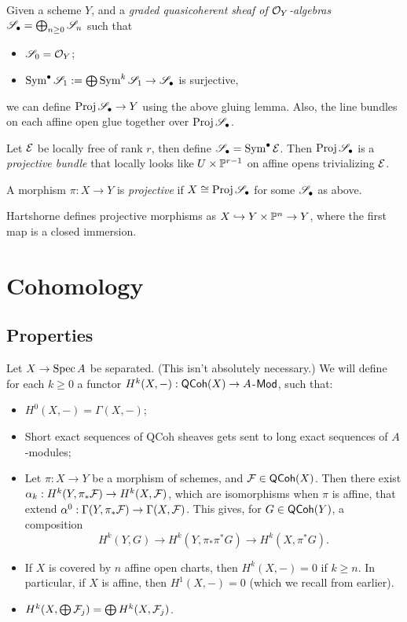 \documentclass[11pt]{amsart}
\begin{document}
Given a scheme $Y$, and a \emph{graded quasicoherent sheaf of $\mathcal{O}_Y$-algebras} $\mathscr{S}_\bullet = \bigoplus_{n\ge 0} \mathscr{S}_n$ such that
\begin{itemize}
    \item $\mathscr{S}_0 = \mathcal{O}_Y$;
    \item $\operatorname{Sym}^{\bullet} \mathscr{S}_1 := \bigoplus \operatorname{Sym}^k \mathscr{S}_1 \to \mathscr{S}_\bullet$ is surjective,
\end{itemize}
we can define $\operatorname{Proj} \mathscr{S}_\bullet\to Y$ using the above gluing lemma. Also, the line bundles on each affine open glue together over $\operatorname{Proj} \mathscr{S}_\bullet$.


\begin{exm}
    Let $\mathcal{E}$ be locally free of rank $r$, then define $\mathscr{S}_\bullet = \operatorname{Sym}^\bullet \mathcal{E}$. Then $\operatorname{Proj} \mathscr{S}_\bullet$ is a \emph{projective bundle} that locally looks like $U\times \mathbb{P}^{r-1}$ on affine opens trivializing $\mathcal{E}$.
\end{exm}

\begin{defn}
    A morphism $\pi:X\to Y$ is \emph{projective} if $X \cong \operatorname{Proj} \mathscr{S}_\bullet$ for some $\mathscr{S}_\bullet$ as above. 
\end{defn}

\begin{Rem}
Hartshorne defines projective morphisms as $X\hookrightarrow Y\times \mathbb{P}^n\to Y$, where the first map is a closed immersion. 
\end{Rem}


\section{Cohomology}

\subsection{Properties}

Let $X\to \operatorname{Spec} A$ be separated. (This isn't absolutely necessary.) We will define for each $k\ge 0$ a functor $H^k(X,-): \mathsf{QCoh}(X) \to A$-$\mathsf{Mod}$, such that:
\begin{itemize}
    \item $H^0(X,-) = \Gamma(X, -)$;
    \item Short exact sequences of QCoh sheaves gets sent to long exact sequences of $A$-modules;
    \item Let $\pi:X\to Y$ be a morphism of schemes, and $\mathcal{F}\in \mathsf{QCoh}(X)$. Then there exist $\alpha_k: H^k(Y, \pi_\ast \mathcal{F}) \to H^k(X, \mathcal{F})$, which are isomorphisms when $\pi$ is affine, that extend $\alpha^0: \Gamma(Y, \pi_\ast \mathcal{F}) \to \Gamma(X, \mathcal{F})$. This gives, for $G\in \mathsf{QCoh}(Y)$, a composition 
    \[H^k(Y,G) \to H^k(Y, \pi_\ast \pi^\ast G) \to H^k(X, \pi^\ast G).\]

    \item If $X$ is covered by $n$ affine open charts, then $H^k(X,-) = 0$ if $k\ge n$. In particular, if $X$ is affine, then $H^1(X,-) = 0$ (which we recall from earlier).
    \item $H^k(X, \bigoplus \mathcal{F}_j) = \bigoplus H^k(X,\mathcal{F}_j)$.
\end{itemize}
\end{document}
